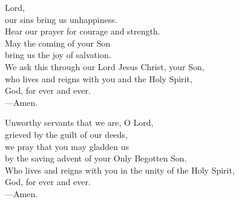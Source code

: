 \prayer


\begin{prayerverse}
Lord,\\
our sins bring us unhappiness.\\
Hear our prayer for courage and strength.\\
May the coming of your Son\\
bring us the joy of salvation.\\
We ask this through our Lord Jesus Christ, your Son,\\
who lives and reigns with you and the Holy Spirit,\\
God, for ever and ever.\\
{\color{red}---\thinspace}Amen.
\end{prayerverse}


\begin{prayerverse}
Unworthy servants that we are, O Lord,\\
grieved by the guilt of our deeds,\\
 we pray that you may gladden us\\
by the saving advent of your Only Begotten Son.\\
Who lives and reigns with you in the unity of the Holy Spirit,\\
God, for ever and ever.\\
{\color{red}---\thinspace}Amen.
\end{prayerverse}

